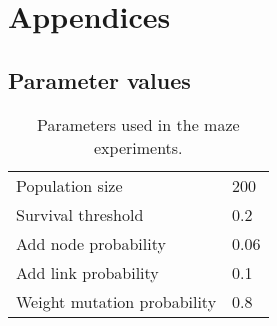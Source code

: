\newpage
\section*{Appendices}

\subsection*{Parameter values}
\begin{table}[H]
    \centering
    \begin{tabular}{ll}
    \toprule
    Population size & 200\\
    Survival threshold & 0.2\\
    Add node probability &  0.06\\
    Add link probability &  0.1\\
    Weight mutation probability &  0.8\\
    \bottomrule
    \end{tabular}
    \captionsetup{justification=centering}
    \caption{Parameters used in the maze experiments.}
\end{table}
